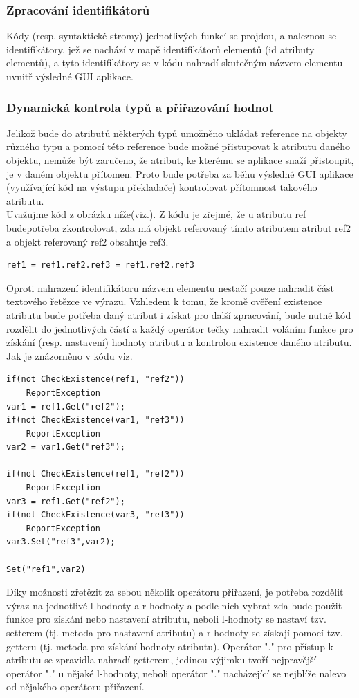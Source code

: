 \documentclass[report,11pt]{elsarticle}
\begin{document}
\subsubsection{Zpracování identifikátorů}
Kódy (resp. syntaktické stromy) jednotlivých funkcí se projdou, a naleznou se identifikátory, jež se nachází v mapě identifikátorů elementů (id atributy elementů), a tyto identifikátory se v kódu nahradí skutečným názvem elementu uvnitř výsledné GUI aplikace.
\subsubsection{Dynamická kontrola typů a přiřazování hodnot}
Jelikož bude do atributů některých typů umožněno ukládat reference na objekty různého typu a pomocí této reference bude možné přistupovat k atributu daného objektu, nemůže být zaručeno, že atribut, ke kterému se aplikace snaží přistoupit, je v daném objektu přítomen. Proto bude potřeba za běhu výsledné GUI aplikace (využívající kód na výstupu překladače) kontrolovat přítomnost takového atributu.\\
Uvažujme kód z obrázku níže(viz.). Z kódu je zřejmé, že u atributu ref budepotřeba zkontrolovat, zda má objekt referovaný tímto atributem atribut ref2 a objekt referovaný ref2 obsahuje ref3.

\begin{lstlisting}[frame=single,caption=Pseudokód problematického použití operátoru "." v přiřazovacím výroku. ]
ref1 = ref1.ref2.ref3 = ref1.ref2.ref3
\end{lstlisting}
Oproti nahrazení identifikátoru názvem elementu nestačí pouze nahradit část textového řetězce ve výrazu. Vzhledem k tomu, že kromě ověření existence atributu bude potřeba daný atribut i získat pro další zpracování, bude nutné kód rozdělit do jednotlivých částí a každý operátor tečky nahradit voláním funkce pro získání (resp. nastavení) hodnoty atributu a kontrolou existence daného atributu.  Jak je znázorněno v kódu viz.
\begin{lstlisting}[frame=single,caption=Řešení v pseudokódu problematického použití operátoru "." v přiřazovacím výroku. ]
if(not CheckExistence(ref1, "ref2"))
	ReportException
var1 = ref1.Get("ref2");
if(not CheckExistence(var1, "ref3"))
	ReportException
var2 = var1.Get("ref3");

if(not CheckExistence(ref1, "ref2"))
	ReportException
var3 = ref1.Get("ref2");
if(not CheckExistence(var3, "ref3"))
	ReportException
var3.Set("ref3",var2);

Set("ref1",var2)
\end{lstlisting}
Díky možnosti zřetězit za sebou několik operátoru přiřazení, je potřeba rozdělit výraz na jednotlivé l-hodnoty a r-hodnoty a podle nich vybrat zda bude použit funkce pro získání nebo nastavení atributu, neboli l-hodnoty se nastaví tzv. setterem (tj. metoda pro nastavení atributu) a r-hodnoty se získají pomocí tzv. getteru (tj. metoda pro získání hodnoty atributu). Operátor "." pro přístup k atributu se zpravidla nahradí getterem, jedinou výjimku tvoří nejpravější operátor "." u nějaké l-hodnoty, neboli operátor "." nacházející se nejblíže nalevo od nějakého operátoru přiřazení.
\end{document}
